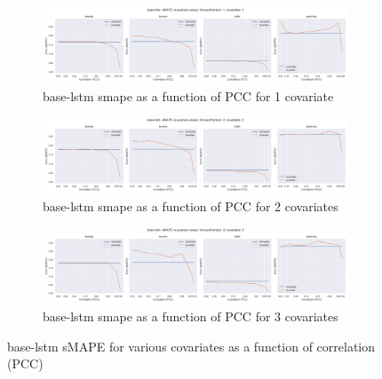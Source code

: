 \documentclass[letterpaper]{article}
\begin{document}
\begin{figure}[ht]

\begin{subfigure}{\textwidth}
\centering
\includegraphics[width=\textwidth]{figures/base-lstm_k_1_smape_vs_pearson.png}
\caption{base-lstm smape as a function of PCC for 1 covariate}
\label{fig:base_lstm_k_1_smape_vs_pearson}
\end{subfigure}

\begin{subfigure}{\textwidth}
\centering
\includegraphics[width=\textwidth]{figures/base-lstm_k_2_smape_vs_pearson.png}
\caption{base-lstm smape as a function of PCC for 2 covariates}
\label{fig:base_lstm_k_2_smape_vs_pearson}
\end{subfigure}

\begin{subfigure}{\textwidth}
\centering
\includegraphics[width=\textwidth]{figures/base-lstm_k_3_smape_vs_pearson.png}
\caption{base-lstm smape as a function of PCC for 3 covariates}
\label{fig:appendix_base_lstm_k_3_smape_vs_pearson}
\end{subfigure}
\caption{base-lstm sMAPE for various covariates as a function of correlation (PCC)}
\label{fig:base_lstm_smape_vs_pearson}
\end{figure}
\end{document}

